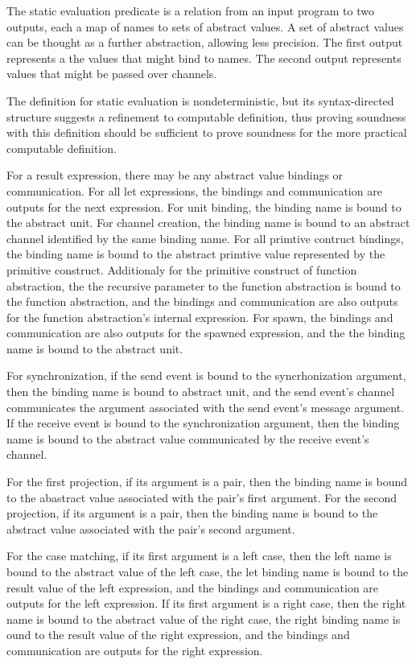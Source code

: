 The static evaluation predicate is a relation from an input program to two outputs, each a map
of names to sets of abstract values.  A set of abstract values can be thought as a further
abstraction, allowing less precision. The first output represents a the values that might bind
to names.  The second output represents values that might be passed over channels.

The definition for static evaluation is nondeterministic, but its syntax-directed structure
suggests a refinement to computable definition, thus proving soundness with this definition
should be sufficient to prove soundness for the more practical computable definition.

For a result expression, there may be any abstract value bindings or communication. For all let
expressions, the bindings and communication are outputs for the next expression. For unit
binding, the binding name is bound to the abstract unit. For channel creation, the binding name
is bound to an abstract channel identified by the same binding name. For all primtive contruct
bindings, the binding name is bound to the abstract primtive value represented by the primitive
construct.  Additionaly for the primitive construct of function abstraction, the the recursive
parameter to the function abstraction is bound to the function abstraction, and the bindings
and communication are also outputs for the function abstraction's internal expression. For
spawn, the bindings and communication are also outputs for the spawned expression, and the the
binding name is bound to the abstract unit.

For synchronization, if the send event is bound to the syncrhonization argument, then the
binding name is bound to abstract unit, and the send event's channel communicates the argument
associated with the send event's message argument.  If the receive event is bound to the
synchronization argument, then the binding name is bound to the abstract value communicated by
the receive event's channel.

For the first projection, if its argument is a pair, then the binding name is bound to the
abastract value associated with the pair's first argument.  For the second projection, if its
argument is a pair, then the binding name is bound to the abstract value associated with the
pair's second argument.  

For the case matching, if its first argument is a left case, then the left name is bound to the
abstract value of the left case, the let binding name is bound to the result value of the left
expression, and the bindings and communication are outputs for the left expression.  If its
first argument is a right case, then the right name is bound to the abstract value of the right
case, the right binding name is ound to the result value of the right expression, and the
bindings and communication are outputs for the right expression. 

